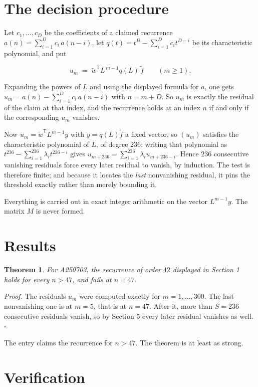 \documentclass[11pt]{article}
\newtheorem{theorem}{Theorem}
\theoremstyle{definition}
\begin{document}
\section{The decision procedure}

Let $c_1,\dots,c_D$ be the coefficients of a claimed recurrence $a(n) = \sum_{i=1}^{D} c_i\,a(n-i)$, let $q(t) = t^{D} - \sum_{i=1}^{D} c_i t^{D-i}$ be its characteristic polynomial, and put

\[u_m \;=\; \tilde w^{\mathsf T} L^{\,m-1} q(L)\,\tilde f \qquad (m \ge 1).\]

Expanding the powers of $L$ and using the displayed formula for $a$, one gets $u_m = a(n) - \sum_{i=1}^{D} c_i\,a(n-i)$ with $n = m + D$. So $u_m$ is exactly the residual of the claim at that index, and the recurrence holds at an index $n$ if and only if the corresponding $u_m$ vanishes.

Now $u_m = \tilde w^{\mathsf T} L^{m-1} y$ with $y = q(L)\tilde f$ a fixed vector, so $(u_m)$ satisfies the characteristic polynomial of $L$, of degree $236$: writing that polynomial as $t^{236} - \sum_{i=1}^{236} \lambda_i t^{236-i}$ gives $u_{m+236} = \sum_{i=1}^{236} \lambda_i u_{m+236-i}$. Hence $236$ consecutive vanishing residuals force every later residual to vanish, by induction. The test is therefore finite; and because it locates the {\itshape last} nonvanishing residual, it pins the threshold exactly rather than merely bounding it.

Everything is carried out in exact integer arithmetic on the vector $L^{m-1}y$. The matrix $M$ is never formed.

\section{Results}

\begin{theorem} For A250703, the recurrence of order $42$ displayed in Section 1 holds for every $n > 47$, and fails at $n = 47$.\end{theorem}

{\itshape Proof.} The residuals $u_m$ were computed exactly for $m = 1,\dots,300$. The last nonvanishing one is at $m = 5$, that is at $n = 47$. After it, more than $S = 236$ consecutive residuals vanish, so by Section 5 every later residual vanishes as well. $\square$

The entry claims the recurrence for $n > 47$. The theorem is at least as strong.

\section{Verification}
\end{document}
